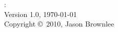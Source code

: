 


\begin{flushleft}
%
\mybooktitle: \mybooksubtitle \\
Version 1.0, \today \\
Copyright \copyright\ 2010, Jason Brownlee \\
%
\end{flushleft}

\hfill


	
\vfill\vfill\vfill